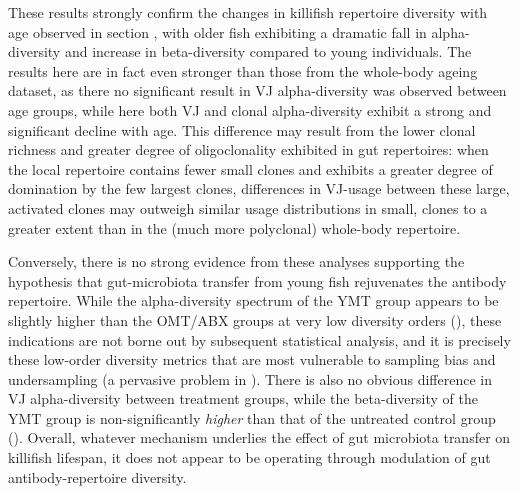 These results strongly confirm the changes in killifish repertoire diversity with age observed in section , with older fish exhibiting a dramatic fall in alpha-diversity and increase in beta-diversity compared to young individuals. The results here are in fact even stronger than those from the whole-body ageing dataset, as there no significant result in VJ alpha-diversity was observed between age groups, while here both VJ and clonal alpha-diversity exhibit a strong and significant decline with age. This difference may result from the lower clonal richness and greater degree of oligoclonality exhibited in gut repertoires: when the local repertoire contains fewer small \naive clones and exhibits a greater degree of domination by the few largest clones, differences in VJ-usage between these large, activated clones may outweigh similar usage distributions in small, \naive clones to a greater extent than in the (much more polyclonal) whole-body repertoire.


Conversely, there is no strong evidence from these analyses supporting the hypothesis that gut-microbiota transfer from young fish rejuvenates the antibody repertoire. While the alpha-diversity spectrum of the YMT group appears to be slightly higher than the OMT/ABX groups at very low diversity orders (), these indications are not borne out by subsequent statistical analysis, and it is precisely these low-order diversity metrics that are most vulnerable to sampling bias and undersampling (a pervasive problem in \igseq). There is also no obvious difference in VJ alpha-diversity between treatment groups, while the beta-diversity of the YMT group is non-significantly \textit{higher} than that of the untreated control group (). Overall, whatever mechanism underlies the effect of gut microbiota transfer on killifish lifespan, it does not appear to be operating through modulation of gut antibody-repertoire diversity. 

